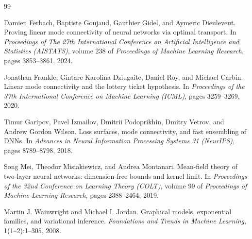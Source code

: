 \documentclass[11pt]{article}
\theoremstyle{definition}
\begin{document}
\begin{thebibliography}{99}

Damien Ferbach, Baptiste Goujaud, Gauthier Gidel, and Aymeric Dieuleveut.
\newblock Proving linear mode connectivity of neural networks via optimal transport.
\newblock In \emph{Proceedings of The 27th International Conference on Artificial Intelligence and Statistics (AISTATS)}, volume 238 of \emph{Proceedings of Machine Learning Research}, pages 3853--3861, 2024.

Jonathan Frankle, Gintare Karolina Dziugaite, Daniel Roy, and Michael Carbin.
\newblock Linear mode connectivity and the lottery ticket hypothesis.
\newblock In \emph{Proceedings of the 37th International Conference on Machine Learning (ICML)}, pages 3259--3269, 2020.

Timur Garipov, Pavel Izmailov, Dmitrii Podoprikhin, Dmitry Vetrov, and Andrew Gordon Wilson.
\newblock Loss surfaces, mode connectivity, and fast ensembling of {DNN}s.
\newblock In \emph{Advances in Neural Information Processing Systems 31 (NeurIPS)}, pages 8789--8798, 2018.

Song Mei, Theodor Misiakiewicz, and Andrea Montanari.
\newblock Mean-field theory of two-layer neural networks: dimension-free bounds and kernel limit.
\newblock In \emph{Proceedings of the 32nd Conference on Learning Theory (COLT)}, volume 99 of \emph{Proceedings of Machine Learning Research}, pages 2388--2464, 2019.

Martin J. Wainwright and Michael I. Jordan.
\newblock Graphical models, exponential families, and variational inference.
\newblock \emph{Foundations and Trends in Machine Learning}, 1(1--2):1--305, 2008.

\end{thebibliography}
\end{document}
